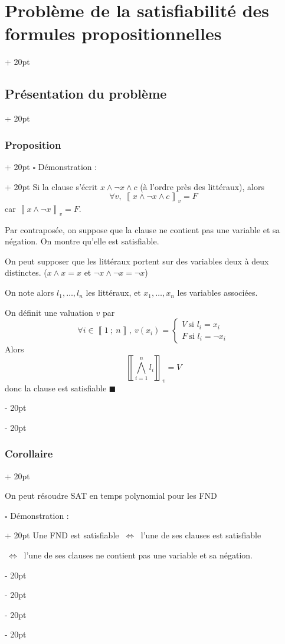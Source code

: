 \documentclass[a4paper, 12pt, twoside]{article}
\newcommand{\nset}[2]{\left\llbracket #1\ ;\ #2 \right\rrbracket}
\newcommand{\lrbb}[1]{\left\llbracket #1 \right\rrbracket}
\newcommand{\ssi}{\ \Leftrightarrow \ }
\newcommand{\eqsys}[2]{\begin{cases} #1 \\ #2 \end{cases}}
\newcommand{\ind}[1][20pt]{\advance\leftskip + #1}
\newcommand{\deind}[1][20pt]{\advance\leftskip - #1}
\newenvironment{indt}[2][20pt]{#2 \par \ind[#1]}{\par \deind} %
\begin{document}
\begin{indt}{\section{Problème de la satisfiabilité des formules propositionnelles}}
\begin{indt}{\subsection{Présentation du problème}}
\begin{indt}{\subsubsection{Proposition}}
                \begin{indt}{$\square$ Démonstration :}
                    \boxed{\Leftarrow} Si la clause s'écrit $x \wedge \neg x \wedge c$ (à l'ordre près des littéraux), alors
                        \[ \forall v,\ \lrbb{x \wedge \neg x \wedge c}_v = F \]
                    car $\lrbb{x \wedge \neg x}_v = F$.
                    
                    \vspace{12pt}
                    
                    \boxed{\Rightarrow} Par contraposée, on suppose que la clause ne contient pas une variable et sa négation. On montre qu'elle est satisfiable.
                    
                    On peut supposer que les littéraux portent sur des variables deux à deux distinctes. ($x \wedge x = x$ et $\neg x \wedge \neg x =\neg x $)
                    
                    On note alors $l_1, \ldots, l_n$ les littéraux, et $x_1, \ldots, x_n$ les variables associées.
                    
                    On définit une valuation $v$ par
                        \[ \forall i \in \nset 1 n,\ v(x_i) = \eqsys{V\ \text{si $l_i = x_i$}}{F\ \text{si $l_i = \neg x_i$}} \]
                    Alors
                        \[ \lrbb{\bigwedge_{i = 1}^n l_i}_v = V \]
                    donc la clause est satisfiable $\blacksquare$
                \end{indt}
            \end{indt}
            
            \vspace{12pt}
            
            \begin{indt}{\subsubsection{Corollaire}}
                \begin{pseudocode}
                    On peut résoudre SAT en temps polynomial pour les FND
                \end{pseudocode}
                
                \begin{indt}{$\square$ Démonstration :}
                    Une FND est satisfiable $\ssi$ l'une de ses clauses est satisfiable
                    
                    $\ssi$ l'une de ses clauses ne contient pas une variable et sa négation.
                    

\end{indt}
\end{indt}
\end{indt}
\end{indt}
\end{document}
